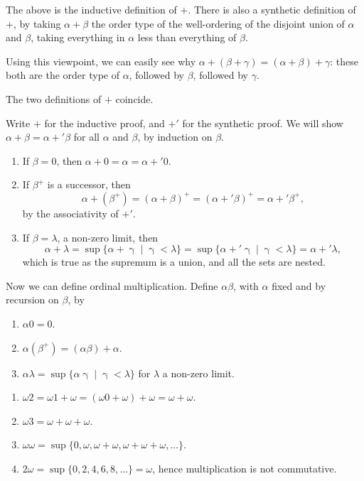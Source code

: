 \documentclass[12pt]{article}
\begin{document}
The above is the inductive definition of $+$. There is also a synthetic definition of $+$, by taking $\alpha + \beta$ the order type of the well-ordering of the disjoint union of $\alpha$ and $\beta$, taking everything in $\alpha$ less than everything of $\beta$.

Using this viewpoint, we can easily see why $\alpha + (\beta + \gamma) = (\alpha + \beta) + \gamma$: these both are the order type of $\alpha$, followed by $\beta$, followed by $\gamma$.

\begin{proposition}
	The two definitions of $+$ coincide.
\end{proposition}

\begin{proofbox}
	Write $+$ for the inductive proof, and $+'$ for the synthetic proof. We will show $\alpha + \beta = \alpha +' \beta$ for all $\alpha$ and $\beta$, by induction on $\beta$.
	\begin{enumerate}
		\item If $\beta = 0$, then $\alpha + 0 = \alpha = \alpha +' 0$.
		\item If $\beta^{+}$ is a successor, then
			\[
			\alpha + (\beta^{+}) = (\alpha + \beta)^{+} = (\alpha +' \beta)^{+} = \alpha +' \beta^{+}
			,\]
			by the associativity of $+'$.
		\item If $\beta = \lambda$, a non-zero limit, then
			\[
				\alpha + \lambda = \sup\{\alpha + \upgamma \mid \upgamma < \lambda\} = \sup\{\alpha +' \upgamma \mid \upgamma < \lambda\} = \alpha +' \lambda
			,\]
			which is true as the supremum is a union, and all the sets are nested.
	\end{enumerate}
\end{proofbox}

Now we can define ordinal multiplication. Define $\alpha \beta$, with $\alpha$ fixed and by recursion on $\beta$, by
\begin{enumerate}
	\item $\alpha 0 = 0$.
	\item $\alpha (\beta^{+}) = (\alpha \beta) + \alpha$.
	\item $\alpha \lambda = \sup\{ \alpha \upgamma \mid \upgamma < \lambda\}$ for $\lambda$ a non-zero limit.
\end{enumerate}

\begin{exbox}
	\begin{enumerate}
		\item $\omega 2 = \omega 1 + \omega = (\omega 0 + \omega) + \omega = \omega + \omega$.
		\item $\omega 3 = \omega + \omega + \omega$.
		\item $\omega \omega = \sup\{0, \omega, \omega + \omega, \omega + \omega + \omega, \ldots\}$.
		\item $2 \omega = \sup\{0, 2, 4, 6, 8, \ldots\} = \omega$, hence multiplication is not commutative.
	\end{enumerate}
\end{exbox}
\end{document}
